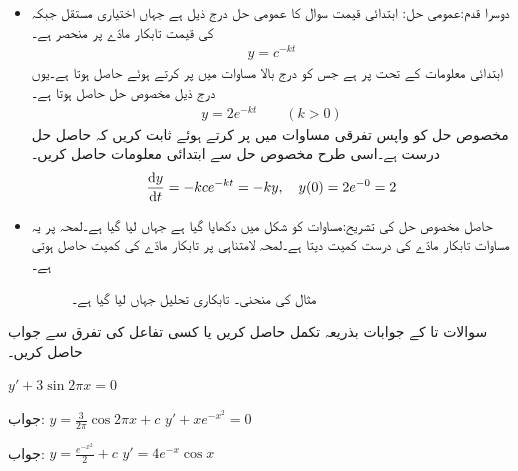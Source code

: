 \begin{itemize}
\item[(ب)]
دوسرا قدم:عمومی حل: \quad ابتدائی قیمت سوال کا عمومی حل درج ذیل ہے جہاں  اختیاری مستقل جبکہ  کی قیمت تابکار مادّے پر منحصر ہے۔
\begin{align}
y=c^{-kt}
\end{align}
ابتدائی معلومات کے تحت  پر  ہے جس کو درج بالا مساوات میں پر کرتے ہوئے  حاصل ہوتا ہے۔یوں درج ذیل مخصوص حل حاصل ہوتا ہے۔
\begin{align}\label{مساوات_سادہ_اول_مخصوص_تابکاری}
y=2e^{-kt}\quad \quad (k>0)
\end{align} 
مخصوص حل کو واپس تفرقی مساوات میں پر کرتے ہوئے ثابت کریں کہ حاصل حل درست ہے۔اسی طرح مخصوص حل سے ابتدائی معلومات حاصل کریں۔
\begin{align*}
\frac{\dif y}{\dif t}=-k ce^{-kt}=-ky, \quad y(0)=2e^{-0}=2
\end{align*}
%
\item[(پ)]
حاصل مخصوص حل کی تشریح:مساوات  کو شکل  میں دکھایا گیا ہے جہاں  لیا گیا ہے۔لمحہ  پر یہ مساوات تابکار مادّے کی درست کمیت دیتا ہے۔لمحہ لامتناہی پر تابکار مادّے کی کمیت  حاصل ہوتی ہے۔
\begin{figure}
\centering
{}
\caption{مثال  کی منحنی۔ تابکاری تحلیل  جہاں  لیا گیا ہے۔}
\label{شکل_مثال_اول_سادہ_تابکاری_الف}
\end{figure} 
%
\end{itemize}

سوالات  تا  کے جوابات بذریعہ تکمل حاصل کریں یا کسی تفاعل کی تفرق سے جواب حاصل کریں۔

\quad
$y'+3\sin 2\pi x=0$

جواب:\quad
  $y=\frac{3}{2\pi} \cos 2\pi x+c$
\quad
$y'+xe^{-x^2}=0$

جواب:\quad
$y=\tfrac{e^{-x^2}}{2}+c$
\quad
$y'=4e^{-x}\cos x$

